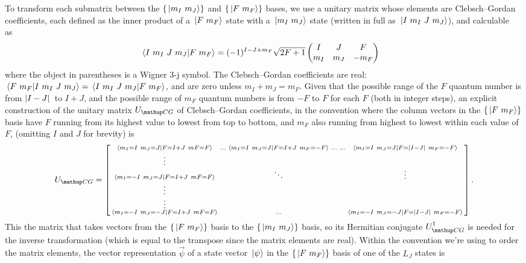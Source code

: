 To transform each submatrix between the $\{\ket{m_I\ m_J}\}$ and $\{\ket{F\ m_F}\}$ bases, we use a unitary matrix whose elements are Clebsch--Gordan coefficients, each defined as the inner product of a $\ket{F\ m_F}$ state with a $\ket{m_I\ m_J}$ state (written in full as $\ket{I\ m_I\ J\ m_J}$), and calculable as~\cite{steck_rubidium_2015}
\begin{align}\label{eq:ClebschGordanCoeffs}
\braket{I\ m_I\ J\ m_J}{F\ m_F} &=
(-1)^{I - J + m_F}\sqrt{2F + 1}
\left(\begin{matrix}
I & J & F\\
m_I & m_J & -m_F\\
\end{matrix}\right)
\end{align}
where the object in parentheses is a Wigner $3$-j symbol. The Clebsch--Gordan coefficients are real: $\braket{F\ m_F}{I\ m_I\ J\ m_J} = \braket{I\ m_I\ J\ m_J}{F\ m_F}$, and are zero unless $m_I + m_J = m_F$.
Given that the possible range of the $F$ quantum number is from $\abs{I - J}$ to $I + J$, and the possible range of $m_F$ quantum numbers is from $-F$ to $F$ for each $F$ (both in integer steps), an explicit construction of the unitary matrix $U_\up{CG}$ of Clebsch--Gordan coefficients, in the convention where the column vectors in the $\{\ket{F\ m_F}\}$ basis have $F$ running from its highest value to lowest from top to bottom, and $m_F$ also running from highest to lowest within each value of $F$, (omitting $I$ and $J$ for brevity) is
\begin{align}
U_\up{CG} = \left[\begin{smallmatrix}
\braket{m_I=I\ m_J=J}{F=I+J\ mF=F} & \hdots &
\braket{m_I=I\ m_J=J}{F=I+J\ m_F=-F} & \hdots &\hdots &
\braket{m_I=I\ m_J=J}{F=\abs{I - J}\ m_F=-F}\\
\vdots\\
\braket{m_I=-I\ m_J=J}{F=I+J\ mF=F} & & \ddots & & & \vdots\\
\vdots\\
\vdots\\
\braket{m_I=-I\ m_J=-J}{F=I+J\ mF=F} & & \hdots & & &
\braket{m_I=-I\ m_J=-J}{F=\abs{I - J}\ m_F=-F}\\
\end{smallmatrix}\right].
\end{align}
This the matrix that takes vectors from the $\{\ket{F\ m_F}\}$ basis to the $\{\ket{m_I\ m_J}\}$ basis, so its Hermitian conjugate $U^\dagger_\up{CG}$ is needed for the inverse transformation (which is equal to the transpose since the matrix elements are real). Within the convention we're using to order the matrix elements, the vector representation $\vec\psi$ of a state vector $\ket{\psi}$ in the $\{\ket{F\ m_F}\}$ basis of one of the $L_J$ states is
